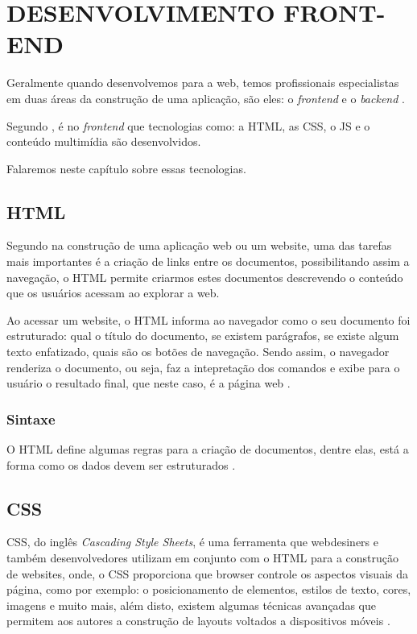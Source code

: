 \section{DESENVOLVIMENTO FRONT-END}

Geralmente quando desenvolvemos para a web, temos profissionais especialistas em
duas áreas da construção de uma aplicação, são eles: o \textit{frontend} e o
\textit{backend} \cite{artigoAvaliacaoEReducaoDoTempoDeRespostaDeSistemasWeb}.

Segundo , é no
\textit{frontend} que tecnologias como: a \ac{HTML}, as \ac{CSS}, o \ac{JS}
e o conteúdo multimídia são desenvolvidos.

Falaremos neste capítulo sobre essas tecnologias.

\subsection{HTML}

Segundo  na construção de uma aplicação web ou
um website, uma das tarefas mais importantes é a criação de links entre os
documentos, possibilitando assim a navegação, o \acs{HTML} permite criarmos
estes documentos descrevendo o conteúdo que os usuários acessam ao explorar a web.

Ao acessar um website, o \acs{HTML} informa ao navegador como o seu documento
foi estruturado: qual o título do documento, se existem parágrafos, se existe
algum texto enfatizado, quais são os botões de navegação. Sendo assim, o
navegador renderiza o documento, ou seja, faz a intepretação dos
comandos e exibe para o usuário o resultado final, que neste caso, é a página
web \cite{headFirstHTMLWithCSSAndXHTML}.

\subsubsection{Sintaxe}

O HTML define algumas regras para a criação de documentos, dentre elas, está a
forma como os dados devem ser estruturados \cite{htmlCSSTheGoodParts}.

\subsection{CSS}

\ac{CSS}, do inglês \textit{Cascading Style Sheets}, é uma ferramenta
que webdesiners e também desenvolvedores utilizam em conjunto com o \ac{HTML}
para a construção de websites, onde, o \acs{CSS} proporciona que \ac{browser}
controle os aspectos visuais da página, como por exemplo: o posicionamento de elementos,
estilos de texto, cores, imagens e muito mais, além disto, existem algumas
técnicas avançadas que permitem aos autores a construção de layouts voltados a
dispositivos móveis \cite{beginningCSSCascadingStyleSheetsForWebDesign}.

